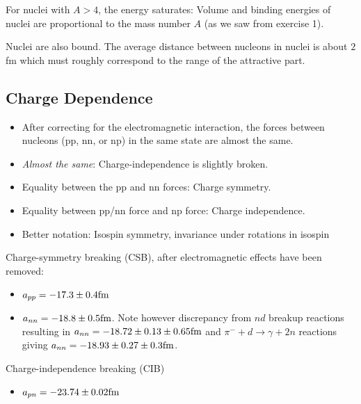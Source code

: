 \documentclass[graybox,sectrefs,envcountresetchap,open=right]{svmonodo}
\begin{document}
\noindent
For nuclei with $A>4$, the energy saturates: Volume and binding energies of nuclei are proportional to the mass number $A$ (as we saw from exercise 1).

\noindent
Nuclei are also bound. The average distance
between nucleons in nuclei is about $2$ fm which
must roughly correspond to the range of the
attractive part.


\subsection{Charge Dependence}

\begin{itemize}
 \item After correcting for the electromagnetic interaction, the forces between nucleons (pp, nn, or np) in the same state are almost the same.

 \item \emph{Almost the same}: Charge-independence is slightly broken.

 \item Equality between the pp and nn forces: Charge symmetry.

 \item Equality between pp/nn force and np force: Charge independence.

 \item Better notation: Isospin symmetry, invariance under rotations in isospin
\end{itemize}

\noindent
Charge-symmetry breaking (CSB), after electromagnetic effects
have been removed:
\begin{itemize}
\item $a_{pp}=  -17.3 \pm 0.4 \hspace{0.cm} \mathrm{fm}$

\item $a_{nn}=-18.8 \pm 0.5 \hspace{0.cm} \mathrm{fm}$. Note however discrepancy from $nd$ breakup reactions resulting in  $a_{nn}=-18.72 \pm 0.13 \pm 0.65 \hspace{0.cm} \mathrm{fm}$ and $\pi^- + d \rightarrow \gamma + 2n$ reactions giving  $a_{nn}=-18.93 \pm 0.27 \pm 0.3 \hspace{0.cm} \mathrm{fm}$.
\end{itemize}

\noindent
Charge-independence breaking (CIB)
\begin{itemize}
\item $a_{pn}=  -23.74 \pm 0.02 \hspace{0.cm} \mathrm{fm}$ 
\end{itemize}
\end{document}

